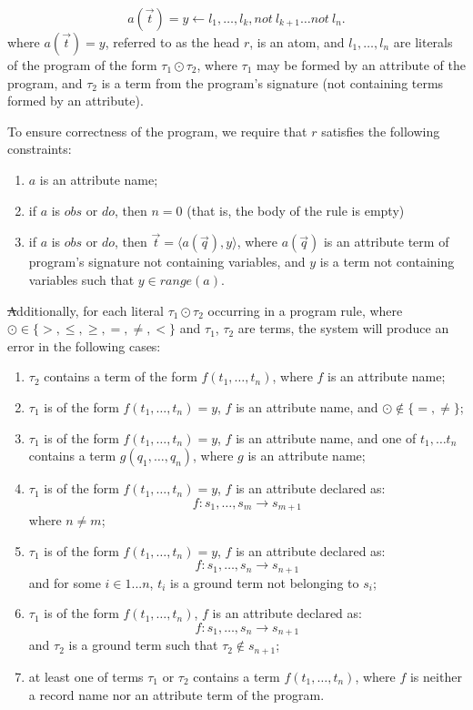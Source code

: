 \documentclass[12pt, letterpaper]{article}
\begin{document}
\begin{equation}
   a(\vec{t}) = y \leftarrow l_1,  \ldots, l_k, not~l_{k+1} \ldots not~l_{n}.
\end{equation}
where $a(\vec{t}) = y$, referred to as the head $r$, is an atom, and  $l_1,\ldots,l_n$ are literals of the program of the form $\tau_1 \odot \tau_2$,
where $\tau_1$ may be formed by an attribute of the program, and $\tau_2$ is a term from the program's signature (not containing terms formed by an attribute).


\medskip\noindent
To ensure correctness of the program, we require that $r$ satisfies the following constraints:
\begin{enumerate}[label=(\arabic*),itemsep=5pt]
\item $a$ is an attribute name;
\item if $a$ is $obs$ or $do$, then $n=0$ (that is, the body of the rule is empty)
\item if $a$ is $obs$ or $do$, then $\vec{t} = \langle a(\vec{q}),y \rangle$, where $a(\vec{q})$ is an attribute term of program's signature not containing variables,
  and $y$ is a term not containing variables such that $y \in range(a)$.
\end{enumerate}

\st
Additionally, for each literal $\tau_1 \odot \tau_2$ occurring in a program rule, where $\odot \in \{>, \leq, \geq, =, \not=, <\}$ and $\tau_1$, $\tau_2$ are terms, the system will produce an error in the following cases:

\begin{enumerate}[label=(\arabic*),itemsep=5pt]
  
\item $\tau_2$ contains a term of the form $f(t_1,\ldots,t_n)$, where $f$ is an attribute name;
\item $\tau_1$ is of the form $f(t_1,\ldots,t_n) = y$, $f$ is an attribute name, and $\odot \not\in\{=,\not=\}$;
\item $\tau_1$ is of the form $f(t_1,\ldots,t_n) = y$, $f$ is an attribute name, and one of $t_1,\ldots t_n$ contains a term $g(q_1,\ldots,q_n)$, where $g$ is an attribute name;
\item $\tau_1$ is of the form $f(t_1,\ldots,t_n) = y$, $f$ is an attribute declared as:
  $$f: s_1,\ldots,s_m \rightarrow s_{m+1}$$
  where $n \not=m$;
  
\item $\tau_1$ is of the form $f(t_1,\ldots,t_n) = y$, $f$ is an attribute declared as:
  $$f: s_1,\ldots,s_n \rightarrow s_{n+1}$$
  and for some $i \in 1...n$, $t_i$ is a ground term not belonging to $s_i$;
  
\item $\tau_1$ is of the form $f(t_1,\ldots,t_n)$, $f$ is an attribute declared as:
  $$f: s_1,\ldots,s_n \rightarrow s_{n+1}$$
  and $\tau_2$ is a ground term such that $\tau_2 \not\in s_{n+1}$;
\item at least one of terms $\tau_1$ or $\tau_2$ contains a term $f(t_1,\ldots,t_n)$, where $f$ is neither a record name nor an attribute term of the program.
\end{enumerate}
\end{document}
